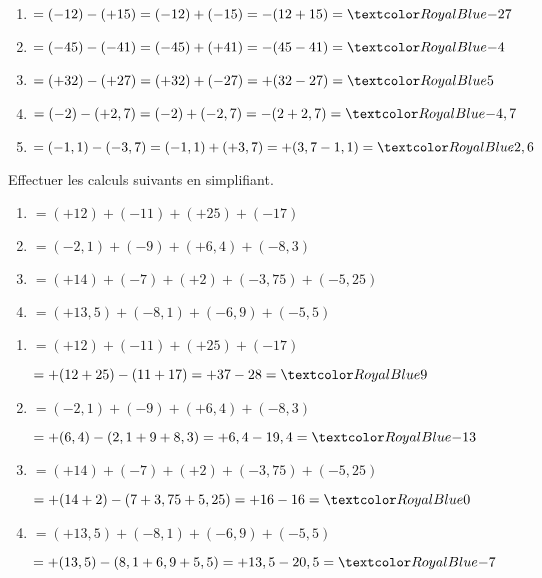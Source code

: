 \begin{Maquette}[Fiche,CorrigeFin,Colonnes=2]{}
\begin{multicols}{2}
      \begin{Solution}
         \begin{enumerate}[label=\Alph*]
            \item $=(-12)-(+15)=(-12)+(-15) =-(12+15) =\cor{-27}$
            \item $=(-45)-(-41) =(-45)+(+41) =-(45-41) =\cor{-4}$
            \item $=(+32)-(+27) =(+32)+(-27) =+(32-27) =\cor{5}$
            \item $=(-2)-(+2,7) =(-2)+(-2,7) =-(2+2,7) =\cor{-4,7}$
            \item {\small$=(-1,1)-(-3,7) =(-1,1)+(+3,7) =+(3,7-1,1) =\cor{2,6}$}
         \end{enumerate}
      \end{Solution}
      
      
      \begin{exercice}[Dur] %
         Effectuer les calculs suivants en simplifiant.
         \begin{enumerate}[label=\Alph*]
            \item $=(+12)+(-11)+(+25)+(-17)$
            \item $=(-2,1)+(-9)+(+6,4)+(-8,3)$
            \item $=(+14)+(-7)+(+2)+(-3,75)+(-5,25)$
            \item $=(+13,5)+(-8,1)+(-6,9)+(-5,5)$
         \end{enumerate}
      \end{exercice}
      
      \begin{Solution}
         \begin{enumerate}[label=\Alph*]
            \item $=(+12)+(-11)+(+25)+(-17)$ \par
               $=+(12+25)-(11+17) =+37-28 =\cor{9}$
            \item $=(-2,1)+(-9)+(+6,4)+(-8,3)$ \par
               $=+(6,4)-(2,1+9+8,3) =+6,4-19,4 =\cor{-13}$
            \item $=(+14)+(-7)+(+2)+(-3,75)+(-5,25)$ \par
               $=+(14+2)-(7+3,75+5,25) =+16-16 =\cor{0}$
            \item $=(+13,5)+(-8,1)+(-6,9)+(-5,5)$ \par
               $=+(13,5)-(8,1+6,9+5,5) =+13,5-20,5 =\cor{-7}$
         \end{enumerate}
      \end{Solution}
      

\end{multicols}
\end{Maquette}
